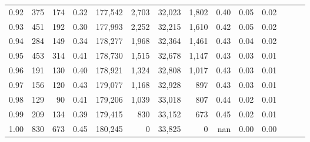 \begin{tabular}{rrrrrrrrrrrrrr}
0.92 &    375 &  174 &  0.32 &  177,542 &    2,703 &  32,023 &   1,802 &  0.40 &  0.05 &      0.02 \\
0.93 &    451 &  192 &  0.30 &  177,993 &    2,252 &  32,215 &   1,610 &  0.42 &  0.05 &      0.02 \\
0.94 &    284 &  149 &  0.34 &  178,277 &    1,968 &  32,364 &   1,461 &  0.43 &  0.04 &      0.02 \\
0.95 &    453 &  314 &  0.41 &  178,730 &    1,515 &  32,678 &   1,147 &  0.43 &  0.03 &      0.01 \\
0.96 &    191 &  130 &  0.40 &  178,921 &    1,324 &  32,808 &   1,017 &  0.43 &  0.03 &      0.01 \\
0.97 &    156 &  120 &  0.43 &  179,077 &    1,168 &  32,928 &     897 &  0.43 &  0.03 &      0.01 \\
0.98 &    129 &   90 &  0.41 &  179,206 &    1,039 &  33,018 &     807 &  0.44 &  0.02 &      0.01 \\
0.99 &    209 &  134 &  0.39 &  179,415 &      830 &  33,152 &     673 &  0.45 &  0.02 &      0.01 \\
1.00 &    830 &  673 &  0.45 &  180,245 &        0 &  33,825 &       0 &   nan &  0.00 &      0.00 \\
\bottomrule
\end{tabular}
